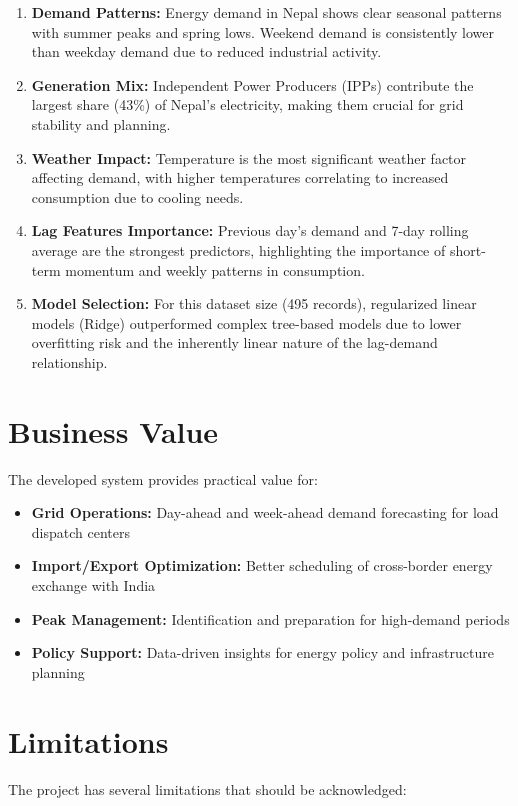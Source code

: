 \begin{enumerate}
    \item \textbf{Demand Patterns:} Energy demand in Nepal shows clear seasonal patterns with summer peaks and spring lows. Weekend demand is consistently lower than weekday demand due to reduced industrial activity.

    \item \textbf{Generation Mix:} Independent Power Producers (IPPs) contribute the largest share (43\%) of Nepal's electricity, making them crucial for grid stability and planning.

    \item \textbf{Weather Impact:} Temperature is the most significant weather factor affecting demand, with higher temperatures correlating to increased consumption due to cooling needs.

    \item \textbf{Lag Features Importance:} Previous day's demand and 7-day rolling average are the strongest predictors, highlighting the importance of short-term momentum and weekly patterns in consumption.

    \item \textbf{Model Selection:} For this dataset size (495 records), regularized linear models (Ridge) outperformed complex tree-based models due to lower overfitting risk and the inherently linear nature of the lag-demand relationship.
\end{enumerate}

\section{Business Value}
The developed system provides practical value for:

\begin{itemize}
    \item \textbf{Grid Operations:} Day-ahead and week-ahead demand forecasting for load dispatch centers
    \item \textbf{Import/Export Optimization:} Better scheduling of cross-border energy exchange with India
    \item \textbf{Peak Management:} Identification and preparation for high-demand periods
    \item \textbf{Policy Support:} Data-driven insights for energy policy and infrastructure planning
\end{itemize}

\section{Limitations}
The project has several limitations that should be acknowledged:

